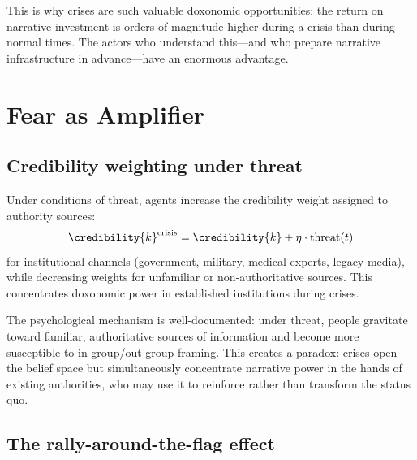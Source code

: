This is why crises are such valuable doxonomic opportunities: the return on narrative investment is orders of magnitude higher during a crisis than during normal times.
The actors who understand this---and who prepare narrative infrastructure in advance---have an enormous advantage.

\section{Fear as Amplifier}
\label{sec:ch29-fear}

\subsection{Credibility weighting under threat}

\begin{proposition}
\label{prop:fear}
Under conditions of threat, agents increase the credibility weight assigned to authority sources:
\[
  \credibility{k}^{\text{crisis}} = \credibility{k} + \eta \cdot \operatorname{threat}(t)
\]
for institutional channels (government, military, medical experts, legacy media), while decreasing weights for unfamiliar or non-authoritative sources.
This concentrates doxonomic power in established institutions during crises.
\end{proposition}

The psychological mechanism is well-documented: under threat, people gravitate toward familiar, authoritative sources of information and become more susceptible to in-group/out-group framing.
This creates a paradox: crises open the belief space but simultaneously concentrate narrative power in the hands of existing authorities, who may use it to reinforce rather than transform the status quo.

\subsection{The rally-around-the-flag effect}


